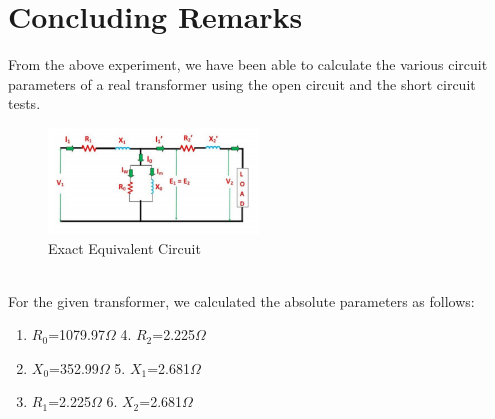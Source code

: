 \documentclass{article}
\begin{document}
\section{Concluding Remarks}
From the above experiment, we have been able to calculate the various circuit
parameters of a real transformer using the open circuit and the short circuit
tests.\\
\begin{figure}[h!]
    \centering
    \includegraphics[width=0.5\textwidth]{img6.png}
    \caption{Exact Equivalent Circuit}
\end{figure}\\
For the given transformer, we calculated the absolute parameters as follows:\\
\begin{enumerate}
    \item $R_{0}$=1079.97$\Omega$ \hspace{30mm} 4. $R_{2}$=2.225$\Omega$
    \item $X_{0}$=352.99$\Omega$  \hspace{31.5mm} 5. $X_{1}$=2.681$\Omega$
    \item $R_{1}$=2.225$\Omega$ \hspace{33.5mm} 6. $X_{2}$=2.681$\Omega$
\end{enumerate}
\end{document}
